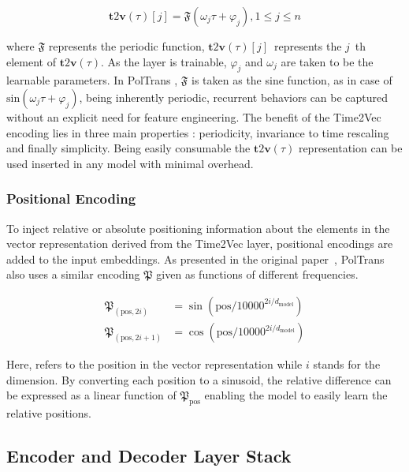 \documentclass[twocolumn]{svjour3}          %
\begin{document}
\begin{equation}
\mathbf{t} 2 \mathbf{v}(\tau)[j]=\mathfrak{F}\left(\omega_{j} \tau+\varphi_{j}\right), 1 \leq j \leq n
\end{equation}

where $\mathfrak{F}$ represents the periodic function, ${\mathbf{t} 2 \mathbf{v}(\tau)[j]}$~represents the ${j}$~th element of ${\mathbf{t} 2 \mathbf{v}(\tau)}$. As the layer is trainable, $\varphi_{j}$ and $\omega_{j}$ are taken to be the learnable parameters. In {PolTrans} , $\mathfrak{F}$ is taken as the sine function, as in case of ${\textrm{sin}\left(\omega_{j} \tau+\varphi_{j}\right)}$, being inherently periodic, recurrent behaviors can be captured without an explicit need for feature engineering. The benefit of the Time2Vec encoding lies in three main properties : periodicity, invariance to time rescaling and finally simplicity. Being easily consumable the ${\mathbf{t} 2 \mathbf{v}(\tau)}$ representation can be used inserted in any model with minimal overhead.

\subsubsection{Positional Encoding}
To inject relative or absolute positioning information about the elements in the vector representation derived from the Time2Vec layer, positional encodings are added to the input embeddings. As presented in the original paper~\cite{Vaswani.2017}, {PolTrans} also uses a similar encoding $\mathfrak{P}$ given as functions of different frequencies.

\begin{equation}
\begin{aligned}
\mathfrak{P}_{(\text{pos}, 2 i)} &=\sin \left(\text{pos} / 10000^{2 i / d_{\text{model}}}\right) \\
\mathfrak{P}_{(\text{pos}, 2 i+1)} &=\cos \left(\text{pos} / 10000^{2 i / d_{\text{model}}}\right)
\end{aligned}
\end{equation}

Here,  refers to the position in the vector representation while ${i}$ stands for the dimension. By converting each position to a sinusoid, the relative difference can be expressed as a linear function of $\mathfrak{P}_{\text{pos}}$ enabling the model to easily learn the relative positions.


\subsection{Encoder and Decoder Layer Stack}
\end{document}
